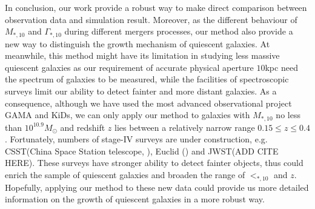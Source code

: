 \documentclass[fleqn,usenatbib]{mnras}
\begin{document}
\par In conclusion, our work provide a robust way to make direct comparison between observation data and simulation result. Moreover, as the different behaviour of $M_{*,10}$ and $\Gamma_{*,10}$ during different mergers processes, our method also provide a new way to distinguish the growth mechanism of quiescent galaxies. At meanwhile, this method might have its limitation in studying less massive quiescent galaxies as our requirement of accurate physical aperture $10$kpc need the spectrum of galaxies to be measured, while the facilities of spectroscopic surveys limit our ability to detect fainter and more distant galaxies. As a consequence, although we have used the most advanced observational project GAMA and KiDs, we can only apply our method to galaxies with $M_{*,10} $ no less than $10^{10.9} M_{\odot}$ and redshift $z$ lies between a relatively narrow range $0.15 \leq z \leq 0.4$. Fortunately, numbers of stage-IV surveys are under construction, e.g. CSST(China Space Station telescope, \cite{csst}), Euclid (\cite{Euclid}) and JWST(ADD CITE HERE). These surveys have stronger ability to detect fainter objects, thus could enrich the sample of quiescent galaxies and broaden the range of $<_{*,10}$ and $z$. Hopefully, applying our method to these new data could provide us more detailed information on the growth of quiescent galaxies in a more robust way. 



\end{document}
